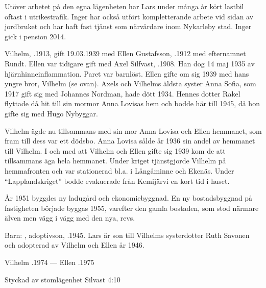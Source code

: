 Utöver arbetet på den egna lägenheten har Lars under många år kört lastbil oftast i utrikestrafik. Inger har också utfört kompletterande arbete vid sidan av jordbruket och har haft fast tjänst som närvårdare inom Nykarleby stad. Inger gick i pension 2014.


%
Vilhelm, .1913, gift 19.03.1939 med Ellen Gustafsson, .1912 med efternamnet Rundt. Ellen var tidigare gift med Axel Silfvast, .1908. Han dog 14 maj 1935 av hjärnhinneinflammation. Paret var barnlöst. Ellen gifte om sig 1939 med hans yngre bror, Vilhelm (se ovan). Axels och Vilhelms äldsta syster Anna Sofia, som 1917 gift sig med Johannes Nordman, hade dött 1934. Hennes dotter Rakel flyttade då hit till sin mormor Anna Lovisas hem och bodde här till 1945, då hon gifte sig med Hugo Nybyggar.

Vilhelm ägde nu tillsammans med sin mor Anna Lovisa och Ellen hemmanet, som fram till dess var ett dödsbo. Anna Lovisa sålde år 1936 sin andel av hemmanet till Vilhelm. I och med att Vilhelm och Ellen gifte sig 1939 kom de att tillsammans äga hela hemmanet. Under kriget tjänstgjorde Vilhelm på hemmafronten och var stationerad bl.a. i Långåminne och Ekenäs. Under ``Lapplandskriget'' bodde evakuerade från Kemijärvi en kort tid i huset.

År 1951 byggdes ny ladugård och ekonomiebyggnad. En ny bostadsbyggnad på fastigheten började byggas 1955, varefter den gamla bostaden, som stod närmare älven men vägg i vägg med den nya, revs.

Barn: , adoptivson, .1945. Lars är son till Vilhelms systerdotter Ruth Savonen och adopterad av Vilhelm och Ellen år 1946.

Vilhelm .1974  ---  Ellen .1975



%

Styckad av stomlägenhet Silvast 4:10


